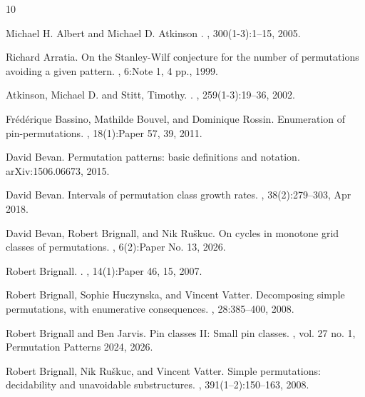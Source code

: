 \documentclass[11pt,a4paper]{article}
\theoremstyle{definition}
\begin{document}
\def\cprime{$'$}
\begin{thebibliography}{10}

Michael H. Albert and Michael D. Atkinson
.
, 300(1-3):1–15, 2005.

Richard Arratia.
\newblock On the {S}tanley-{W}ilf conjecture for the number of permutations
  avoiding a given pattern.
, 6:Note 1, 4 pp., 1999.

Atkinson, Michael D. and Stitt, Timothy.
.
, 259(1-3):19–36, 2002.

Fr{\'e}d{\'e}rique Bassino, Mathilde Bouvel, and Dominique Rossin.
\newblock Enumeration of pin-permutations.
, 18(1):Paper 57, 39, 2011.

David Bevan.
\newblock Permutation patterns: basic definitions and notation.
\newblock arXiv:1506.06673, 2015.

David Bevan.
\newblock Intervals of permutation class growth rates.
, 38(2):279--303, Apr 2018.

David Bevan, Robert Brignall, and Nik Ru\v{s}kuc.
\newblock On cycles in monotone grid classes of permutations.
, 6(2):Paper No. 13, 2026.

Robert Brignall.
.
, 14(1):Paper 46, 15, 2007.

Robert Brignall, Sophie Huczynska, and Vincent Vatter.
\newblock Decomposing simple permutations, with enumerative consequences.
, 28:385--400, 2008.

Robert Brignall and Ben Jarvis.
\newblock Pin classes {II}: {S}mall pin classes.
, vol. 27 no. 1, Permutation Patterns 2024, 2026.

Robert Brignall, Nik Ru\v{s}kuc, and Vincent Vatter.
\newblock Simple permutations: decidability and unavoidable substructures.
, 391(1--2):150--163, 2008.


\end{thebibliography}
\end{document}
